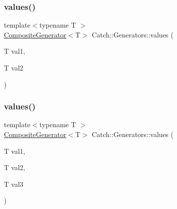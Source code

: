 \mbox{\label{namespace_catch_1_1_generators_a7a2c5bebb3c06c5b0ca05a80289b9eb1}} 
\subsubsection{\texorpdfstring{values()}{values()}\hspace{0.1cm}{\footnotesize\ttfamily [1/3]}}
{\footnotesize\ttfamily template$<$typename T $>$ \\
\mbox{\hyperlink{class_catch_1_1_composite_generator}{Composite\+Generator}}$<$T$>$ Catch\+::\+Generators\+::values (\begin{DoxyParamCaption}\item[{T}]{val1,  }\item[{T}]{val2 }\end{DoxyParamCaption})}

\mbox{\label{namespace_catch_1_1_generators_a496c4a826107e47203b6c609cfd8c2c5}} 
\subsubsection{\texorpdfstring{values()}{values()}\hspace{0.1cm}{\footnotesize\ttfamily [2/3]}}
{\footnotesize\ttfamily template$<$typename T $>$ \\
\mbox{\hyperlink{class_catch_1_1_composite_generator}{Composite\+Generator}}$<$T$>$ Catch\+::\+Generators\+::values (\begin{DoxyParamCaption}\item[{T}]{val1,  }\item[{T}]{val2,  }\item[{T}]{val3 }\end{DoxyParamCaption})}

\mbox{\label{namespace_catch_1_1_generators_afb1dcf02bfc8cdf990f27fdc7d7e4a4e}} 
